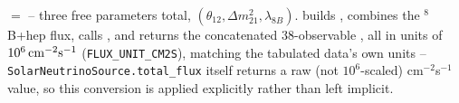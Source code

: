 \begin{implbox}
 $=$
 -- three free parameters
total, $(\theta_{12},\Delta m^2_{21},\lambda_{8B})$. 
builds , combines the $^8$B+hep flux, calls
, and returns the concatenated 38-observable
, all in units of $10^6\,{\rm cm^{-2}s^{-1}}$
(\texttt{FLUX\_UNIT\_CM2S}), matching the tabulated data's own units --
\texttt{SolarNeutrinoSource.total\_flux} itself returns a raw (not
$10^6$-scaled) cm$^{-2}$s$^{-1}$ value, so this conversion is applied
explicitly rather than left implicit.
\end{implbox}
